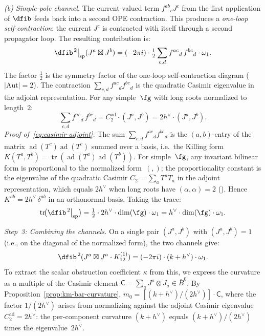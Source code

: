 \begin{computation}[First-principles derivation of
$\kappa(\widehat{\fg}_k) = \dim(\fg)(k+h^\vee)/(2h^\vee)$]
\emph{(b) Simple-pole channel.}
The current-valued term $f^{ab}{}_c J^c$ from the first
application of $\dfib$ feeds back into a second OPE
contraction. This produces a \emph{one-loop self-contraction}:
the current $J^c$ is contracted with itself through a second
propagator loop. The resulting contribution is:
\begin{equation}\label{eq:km-sp-channel}
\dfib^{\,2}\big|_{\mathrm{sp}}(J^a \boxtimes J^b)
= (-2\pi i)\cdot
\tfrac{1}{2}\sum_{c,d} f^{ac}{}_{d}\, f^{bc}{}_{d}
\cdot \omega_1.
\end{equation}
The factor $\frac{1}{2}$ is the symmetry factor of the
one-loop self-contraction diagram ($|\mathrm{Aut}| = 2$).
The contraction $\sum_{c,d} f^{ac}{}_d f^{bc}{}_d$ is
the quadratic Casimir eigenvalue in the adjoint
representation. For any simple~$\fg$ with long roots
normalized to length~$2$:
\begin{equation}\label{eq:casimir-adjoint}
\sum_{c,d} f^{ac}{}_{d}\, f^{bc}{}_{d}
= C_2^{\mathrm{ad}} \cdot (J^a, J^b)
= 2h^\vee \cdot (J^a, J^b).
\end{equation}
\emph{Proof of~\eqref{eq:casimir-adjoint}.}
The sum $\sum_{c,d} f^{ac}{}_d f^{bc}{}_d$ is the
$(a,b)$-entry of the matrix
$\operatorname{ad}(T^c)\operatorname{ad}(T^c)$ summed
over a basis, i.e.\ the Killing form
$K(T^a, T^b) = \operatorname{tr}(
 \operatorname{ad}(T^a)\operatorname{ad}(T^b))$.
For simple~$\fg$, any invariant bilinear form is
proportional to the normalized form~$(,)$; the
proportionality constant is the eigenvalue of the
quadratic Casimir $C_2 = \sum_a T^a T_a$ in the adjoint
representation, which equals $2h^\vee$ when long roots
have $({\alpha},{\alpha}) = 2$
(\cite[Proposition~6.1]{Kac}). Hence
$K^{ab} = 2h^\vee\,\delta^{ab}$ in an orthonormal
basis.
Taking the trace:
\[
\operatorname{tr}\!\bigl(\dfib^{\,2}\big|_{\mathrm{sp}}\bigr)
= \tfrac{1}{2}\cdot 2h^\vee \cdot \dim(\fg) \cdot \omega_1
= h^\vee \cdot \dim(\fg) \cdot \omega_1.
\]

\emph{Step~3: Combining the channels.}
On a single pair $(J^a, J^b)$ with $(J^a, J^b) = 1$
(i.e., on the diagonal of the normalized form),
the two channels give:
\begin{equation}\label{eq:km-combined-per-component}
\dfib^{\,2}(J^a \boxtimes J^a \cdot K^{(1)}_{12})
= (-2\pi i)\cdot(k + h^\vee)\cdot\omega_1.
\end{equation}
To extract the scalar obstruction coefficient
$\kappa$ from this, we express the curvature as
a multiple of the Casimir element
$\mathsf{C} = \sum_a J^a \otimes J_a \in \bar{B}^0$.
By Proposition~\ref{prop:km-bar-curvature},
$m_0 = [(k + h^\vee)/(2h^\vee)] \cdot \mathsf{C}$,
where the factor $1/(2h^\vee)$ arises from
normalizing against the adjoint Casimir eigenvalue
$C_2^{\mathrm{ad}} = 2h^\vee$:
the per-component curvature $(k + h^\vee)$
equals $(k + h^\vee)/(2h^\vee)$ times the
eigenvalue~$2h^\vee$.


\end{computation}
